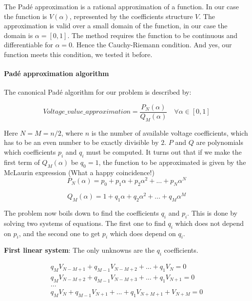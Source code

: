 \documentclass[nols,a4paper,twoside,symmetric,notoc,fleqn]{tufte-book}
\begin{document}
The Pad\'e approximation is a rational approximation of a function. In our case the function is ${V}(\alpha)$, represented by the coefficients structure ${V}$. The approximation is valid over a small domain of the function, in our case the domain is $\alpha=[0,1]$. The method requires the function to be continuous and differentiable for $\alpha=0$. Hence the Cauchy-Riemann condition. And yes, our function meets this condition, we tested it before.

\paragraph{Pad\'e approximation algorithm}

The canonical Pad\'e algorithm for our problem is described by:

\begin{equation}
Voltage\_value\_approximation = \frac{P_N(\alpha)}{Q_M(\alpha)} \quad \forall \alpha \in [0,1]
\label{eq:pade_apprx}
\end{equation}

Here $N=M=n/2$, where $n$ is the number of available voltage coefficients, which has to be an even number to be exactly divisible by $2$. $P$ and $Q$ are polynomials which coefficients $p_i$ and $q_i$ must be computed. It turns out that if we make the first term of $Q_M(\alpha)$ be $q_0=1$, the function to be approximated is given by the McLaurin expression (What a happy coincidence!)
\begin{equation}
P_N(\alpha) = p_0 + p_1\alpha + p_2\alpha^2 + ... + p_N\alpha^N
\end{equation}

\begin{equation}
Q_M(\alpha) = 1 + q_1\alpha + q_2\alpha^2 + ... + q_M\alpha^M
\end{equation}



The problem now boils down to find the coefficients $q_i$ and $p_i$. This is done by solving two systems of equations. The first one to find $q_i$ which does not depend on $p_i$, and the second one to get $p_i$ which does depend on $q_i$.

\textbf{First linear system}: The only unknowns are the $q_i$ coefficients.

\begin{equation}
\begin{matrix}
q_M V_{N-M+1} + q_{M-1}V_{N-M+2}+...+q_1V_N = 0\\
q_M V_{N-M+2} + q_{M-1}V_{N-M+3}+...+q_1V_{N+1} = 0\\
...\\
q_M V_{N} + q_{M-1}V_{N+1}+...+q_1V_{N+M+1} + V_{N+M} = 0\\
\end{matrix}
\end{equation}
\end{document}
